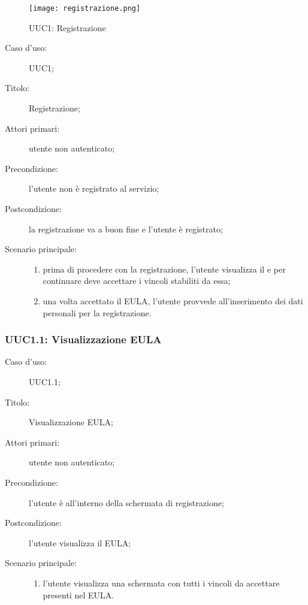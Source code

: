 \documentclass[../../../analisi-dei-requisiti.tex]{subfiles}
\begin{document}
\begin{figure}[H]
  \centering
  \texttt{[image: registrazione.png]}
  \caption{UUC1: Registrazione}%
  \label{fig:uuc1}
\end{figure}

\begin{description}
  \item[Caso d’uso:] UUC1;
  \item[Titolo:] Registrazione;
  \item[Attori primari:] utente non autenticato;
  \item[Precondizione:] l'utente non è registrato al servizio;
  \item[Postcondizione:] la registrazione va a buon fine e l'utente è registrato;
  \item[Scenario principale:]
        \begin{enumerate}
          \item prima di procedere con la registrazione, l'utente visualizza il  e per continuare deve accettare i vincoli stabiliti da essa;
          \item una volta accettato il EULA, l'utente provvede all'inserimento dei dati personali per la registrazione.
        \end{enumerate}
\end{description}


\subsubsection{UUC1.1: Visualizzazione EULA}%
\label{subs:UUC1.1}
\begin{description}
  \item[Caso d’uso:] UUC1.1;
  \item[Titolo:] Visualizzazione EULA\@;
  \item[Attori primari:] utente non autenticato;
  \item[Precondizione:] l'utente è all'interno della schermata di registrazione;
  \item[Postcondizione:] l'utente visualizza il EULA\@;
  \item[Scenario principale:]
        \begin{enumerate}
          \item l'utente visualizza una schermata con tutti i vincoli da accettare presenti nel EULA\@.
        \end{enumerate}
\end{description}
\end{document}
